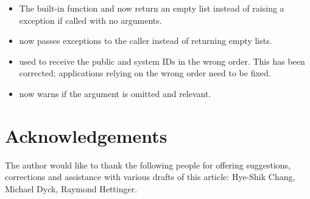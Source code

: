 \documentclass{howto}
\begin{document}
\begin{itemize}

\item The  built-in function and 
  now return  an empty list instead of raising a 
  exception if called with no arguments.

\item {} now passes exceptions to the caller
      instead of returning empty lists.

\item {} used to receive the public and
  system IDs in the wrong order.  This has been corrected; applications
  relying on the wrong order need to be fixed.

\item {} now warns if the  
 argument is omitted and relevant.

\end{itemize}


\section{Acknowledgements \label{acks}}

The author would like to thank the following people for offering
suggestions, corrections and assistance with various drafts of this
article: Hye-Shik Chang, Michael Dyck, Raymond Hettinger.
\end{document}
